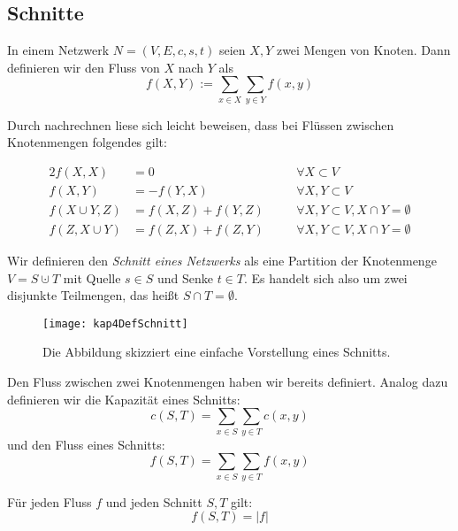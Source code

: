 \subsection{Schnitte}
\begin{Def}
  \hspace{\parindent}In einem Netzwerk $N=(V, E, c, s, t)$ seien $X, Y$ zwei Mengen von Knoten. Dann definieren wir den Fluss von $X$ nach $Y$ als
\[ f(X,Y) := \sum_{x \in X} \sum_{y \in Y} f(x,y) \]
\end{Def}

Durch nachrechnen liese sich leicht beweisen, dass bei Flüssen zwischen Knotenmengen folgendes gilt:
\begin{Lma}\label{Lemma41}
  \begin{alignat*}{2}
    f(X,X) &= 0 &\quad& \forall X \subset V\\
    f(X,Y) &= -f(Y,X) && \forall X,Y \subset V\\
    f(X \cup Y, Z) &= f(X,Z) + f(Y,Z) && \forall X,Y \subset V, X \cap Y = \emptyset\\
    f(Z, X \cup Y) &= f(Z,X) + f(Z,Y) && \forall X,Y \subset V, X \cap Y = \emptyset
  \end{alignat*}
\end{Lma}

\begin{Def}[Schnitt]
  \hspace{\parindent}Wir definieren den \textit{Schnitt eines Netzwerks} als eine Partition der Knotenmenge $V = S \cupdot T$ mit Quelle $s \in S$ und Senke $t \in T$. Es handelt sich also um zwei disjunkte Teilmengen, das heißt $S \cap T = \emptyset$.
\end{Def}

\begin{figure}[htb]
  \centering
  \texttt{[image: kap4DefSchnitt]}
  \caption{Die Abbildung skizziert eine einfache Vorstellung eines Schnitts.}
  \label{kap4DefSchnitt}
\end{figure}

Den Fluss zwischen zwei Knotenmengen haben wir bereits definiert. Analog dazu definieren wir die Kapazität eines Schnitts:
\[c(S,T) = \sum_{x \in S} \sum_{y \in T} c(x,y)\]
und den Fluss eines Schnitts:
\[ f(S,T) = \sum_{x \in S} \sum_{y \in T} f(x,y) \]

\begin{Lma}\label{Lemma42}
  Für jeden Fluss $f$ und jeden Schnitt $S, T$ gilt: \[ f(S,T) = |f| \]
\end{Lma}

